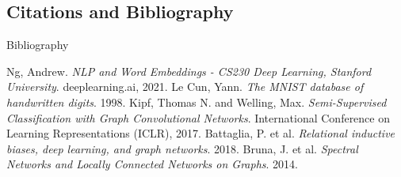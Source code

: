 \documentclass{beamer}
\begin{document}
\begin{darkframes}
    \subsection{Citations and Bibliography}
    
    \begin{frame}[label=bibliography]{Bibliography}
      \begin{thebibliography}{9}
        \scriptsize{
            Ng, Andrew.
            \emph{NLP and Word Embeddings - CS230 Deep Learning, Stanford University}.
            deeplearning.ai, 2021.
            Le Cun, Yann.
            \emph{The MNIST database of handwritten digits}.
            1998.
            Kipf, Thomas N. and Welling, Max.
            \emph{Semi-Supervised Classification with Graph Convolutional Networks}.
            International Conference on Learning Representations (ICLR), 2017.
            Battaglia, P. et al.
            \emph{Relational inductive biases, deep learning, and graph networks}. 2018.
            Bruna, J. et al.
            \emph{Spectral Networks and Locally Connected Networks on Graphs}. 2014.
        }
        
        
      \end{thebibliography}
    \end{frame}
\end{darkframes}
\end{document}
